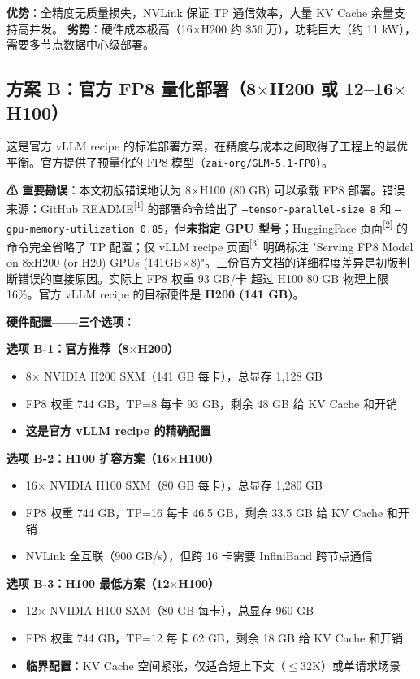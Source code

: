 \documentclass[UTF8,a4paper,10pt,oneside]{ctexart}
\begin{document}
\textbf{优势}：全精度无质量损失，NVLink 保证 TP 通信效率，大量 KV Cache 余量支持高并发。\newline
\textbf{劣势}：硬件成本极高（16$\times$H200 约 \$56 万），功耗巨大（约 11 kW），需要多节点数据中心级部署。

\subsection{方案 B：官方 FP8 量化部署（8$\times$H200 或 12--16$\times$H100）}

这是官方 vLLM recipe 的标准部署方案，在精度与成本之间取得了工程上的最优平衡。官方提供了预量化的 FP8 模型（\texttt{zai-org/GLM-5.1-FP8}）。

\textbf{⚠ 重要勘误}：本文初版错误地认为 8$\times$H100 (80 GB) 可以承载 FP8 部署。错误来源：GitHub README\textsuperscript{[1]} 的部署命令给出了 \texttt{--tensor-parallel-size 8} 和 \texttt{--gpu-memory-utilization 0.85}，但\textbf{未指定 GPU 型号}；HuggingFace 页面\textsuperscript{[2]} 的命令完全省略了 TP 配置；仅 vLLM recipe 页面\textsuperscript{[3]} 明确标注 "Serving FP8 Model on 8xH200 (or H20) GPUs (141GB$\times$8)"。三份官方文档的详细程度差异是初版判断错误的直接原因。实际上 FP8 权重 93 GB/卡 超过 H100 80 GB 物理上限 16\%。官方 vLLM recipe 的目标硬件是 \textbf{H200 (141 GB)}。

\textbf{硬件配置——三个选项}：

\textbf{选项 B-1：官方推荐（8$\times$H200）}
\begin{itemize}
    \item 8$\times$ NVIDIA H200 SXM（141 GB 每卡），总显存 1,128 GB
    \item FP8 权重 744 GB，TP=8 每卡 93 GB，剩余 48 GB 给 KV Cache 和开销
    \item \textbf{这是官方 vLLM recipe 的精确配置}
\end{itemize}

\textbf{选项 B-2：H100 扩容方案（16$\times$H100）}
\begin{itemize}
    \item 16$\times$ NVIDIA H100 SXM（80 GB 每卡），总显存 1,280 GB
    \item FP8 权重 744 GB，TP=16 每卡 46.5 GB，剩余 33.5 GB 给 KV Cache 和开销
    \item NVLink 全互联（900 GB/s），但跨 16 卡需要 InfiniBand 跨节点通信
\end{itemize}

\textbf{选项 B-3：H100 最低方案（12$\times$H100）}
\begin{itemize}
    \item 12$\times$ NVIDIA H100 SXM（80 GB 每卡），总显存 960 GB
    \item FP8 权重 744 GB，TP=12 每卡 62 GB，剩余 18 GB 给 KV Cache 和开销
    \item \textbf{临界配置}：KV Cache 空间紧张，仅适合短上下文（$\leq$32K）或单请求场景
\end{itemize}
\end{document}

